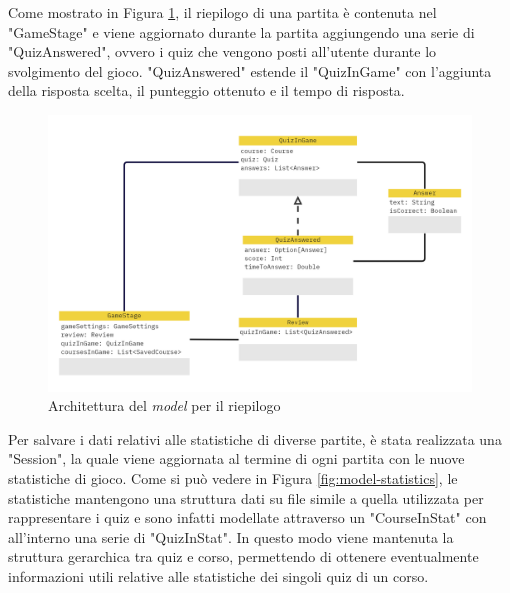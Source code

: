         Come mostrato in Figura \ref{fig:model-review}, il riepilogo di una partita è contenuta nel "GameStage" e viene aggiornato durante la partita aggiungendo una serie di "QuizAnswered", ovvero i quiz che vengono posti all'utente durante lo svolgimento del gioco. "QuizAnswered" estende il "QuizInGame" con l'aggiunta della risposta scelta, il punteggio ottenuto e il tempo di risposta.
    
        \begin{figure}[H]
            \centering
            \includegraphics[scale=0.4]{Miro/review_model.png}
            \caption{Architettura del \textit{model} per il riepilogo}
            \label{fig:model-review}
        \end{figure}

        Per salvare i dati relativi alle statistiche di diverse partite, è stata realizzata una "Session", la quale viene aggiornata al termine di ogni partita con le nuove statistiche di gioco. Come si può vedere in Figura \ref{fig:model-statistics}, le statistiche mantengono una struttura dati su file simile a quella utilizzata per rappresentare i quiz e sono infatti modellate attraverso un "CourseInStat" con all'interno una serie di "QuizInStat". In questo modo viene mantenuta la struttura gerarchica tra quiz e corso, permettendo di ottenere eventualmente informazioni utili relative alle statistiche dei singoli quiz di un corso.

